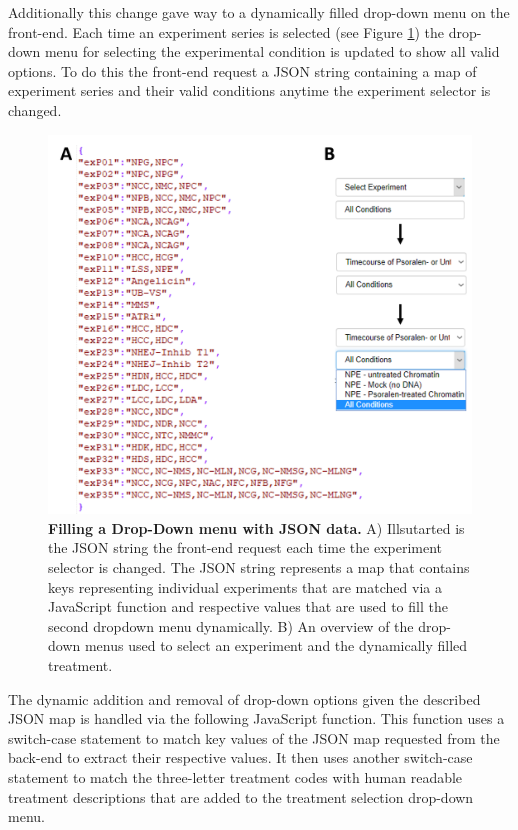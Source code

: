 Additionally this change gave way to a dynamically filled drop-down menu on the front-end. Each time an experiment series is selected (see Figure \ref{fig:dropdown_plotting}) the drop-down menu for selecting the experimental condition is updated to show all valid options. To do this the front-end request a JSON string containing a map of experiment series and their valid conditions anytime the experiment selector is changed. 
\begin{figure}[H]
    \centering
    \includegraphics[width=.7\textwidth]{resources/images/Results/dropdown_plotting.png}
    \caption[Filling a Drop-Down menu with JSON data]{\textbf{Filling a Drop-Down menu with JSON data. }A) Illsutarted is the JSON string the front-end request each time the experiment selector is changed. The JSON string represents a map that contains keys representing individual experiments that are matched via a JavaScript function and respective values that are used to fill the second dropdown menu dynamically. B) An overview of the drop-down menus used to select an experiment and the dynamically filled treatment.}
    \label{fig:dropdown_plotting}
\end{figure}
The dynamic addition and removal of drop-down options given the described JSON map is handled via the following JavaScript function. This function uses a switch-case statement to match key values of the JSON map requested from the back-end to extract their respective values. It then uses another switch-case statement to match the three-letter treatment codes with human readable treatment descriptions that are added to the treatment selection drop-down menu.\\
\newpage
\lstset{language=htmlcssjs}
